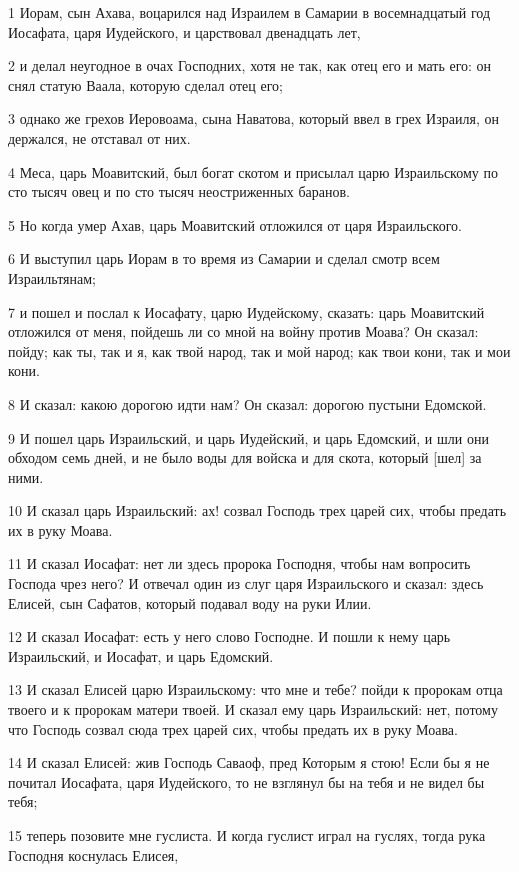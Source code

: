 \par 1 Иорам, сын Ахава, воцарился над Израилем в Самарии в восемнадцатый год Иосафата, царя Иудейского, и царствовал двенадцать лет,
\par 2 и делал неугодное в очах Господних, хотя не так, как отец его и мать его: он снял статую Ваала, которую сделал отец его;
\par 3 однако же грехов Иеровоама, сына Наватова, который ввел в грех Израиля, он держался, не отставал от них.
\par 4 Меса, царь Моавитский, был богат скотом и присылал царю Израильскому по сто тысяч овец и по сто тысяч неостриженных баранов.
\par 5 Но когда умер Ахав, царь Моавитский отложился от царя Израильского.
\par 6 И выступил царь Иорам в то время из Самарии и сделал смотр всем Израильтянам;
\par 7 и пошел и послал к Иосафату, царю Иудейскому, сказать: царь Моавитский отложился от меня, пойдешь ли со мной на войну против Моава? Он сказал: пойду; как ты, так и я, как твой народ, так и мой народ; как твои кони, так и мои кони.
\par 8 И сказал: какою дорогою идти нам? Он сказал: дорогою пустыни Едомской.
\par 9 И пошел царь Израильский, и царь Иудейский, и царь Едомский, и шли они обходом семь дней, и не было воды для войска и для скота, который [шел] за ними.
\par 10 И сказал царь Израильский: ах! созвал Господь трех царей сих, чтобы предать их в руку Моава.
\par 11 И сказал Иосафат: нет ли здесь пророка Господня, чтобы нам вопросить Господа чрез него? И отвечал один из слуг царя Израильского и сказал: здесь Елисей, сын Сафатов, который подавал воду на руки Илии.
\par 12 И сказал Иосафат: есть у него слово Господне. И пошли к нему царь Израильский, и Иосафат, и царь Едомский.
\par 13 И сказал Елисей царю Израильскому: что мне и тебе? пойди к пророкам отца твоего и к пророкам матери твоей. И сказал ему царь Израильский: нет, потому что Господь созвал сюда трех царей сих, чтобы предать их в руку Моава.
\par 14 И сказал Елисей: жив Господь Саваоф, пред Которым я стою! Если бы я не почитал Иосафата, царя Иудейского, то не взглянул бы на тебя и не видел бы тебя;
\par 15 теперь позовите мне гуслиста. И когда гуслист играл на гуслях, тогда рука Господня коснулась Елисея,
